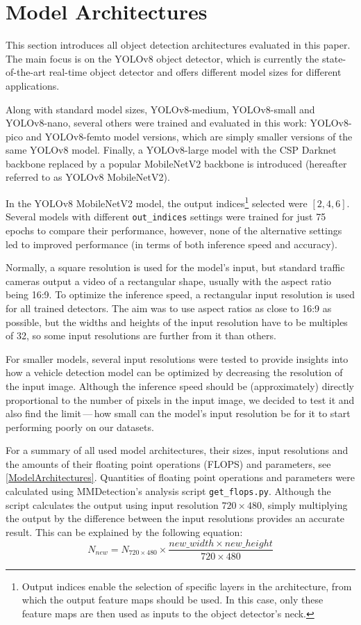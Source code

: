 \section{Model Architectures}


This section introduces all object detection architectures evaluated in this
paper.  The main focus is on the YOLOv8 object detector, which is currently the
state-of-the-art real-time object detector and offers different model sizes for
different applications.

Along with standard model sizes, YOLOv8-medium, YOLOv8-small and YOLOv8-nano,
several others were trained and evaluated in this work: YOLOv8-pico and
YOLOv8-femto model versions, which are simply smaller versions of the same
YOLOv8 model. Finally, a YOLOv8-large model with the CSP Darknet backbone
replaced by a popular MobileNetV2 backbone is introduced (hereafter referred to
as YOLOv8 MobileNetV2).

In the YOLOv8 MobileNetV2 model, the output indices\footnote{Output indices
enable the selection of specific layers in the architecture, from which the
output feature maps should be used. In this case, only these feature maps are
then used as inputs to the object detector's neck.} selected were $[2, 4, 6]$.
Several models with different \texttt{out\_indices} settings were trained for
just 75 epochs to compare their performance, however, none of the alternative
settings led to improved performance (in terms of both inference speed and
accuracy).

Normally, a square resolution is used for the model's input, but standard traffic cameras
output a video of a rectangular shape, usually with the aspect ratio being 16:9.
To optimize the inference speed, a rectangular input resolution is used for all
trained detectors. The aim was to use aspect ratios as close to 16:9 as
possible, but the widths and heights of the input resolution have to be multiples of
32, so some input resolutions are further from it than others.

For smaller models, several input resolutions were tested to provide insights
into how a vehicle detection model can be optimized by decreasing the resolution
of the input image. Although the inference speed should be (approximately)
directly proportional to the number of pixels in the input image, we decided to
test it and also find the limit\,---\,how small can the model's input resolution
be for it to start performing poorly on our datasets.

For a summary of all used model architectures, their sizes, input resolutions and the
amounts of their floating point operations (FLOPS) and parameters, see
\autoref{ModelArchitectures}. Quantities of floating point operations and
parameters were calculated using MMDetection's analysis script
\verb|get_flops.py|. Although the script calculates the output using input
resolution $720 \times 480$, simply multiplying the output by the difference
between the input resolutions provides an accurate result. This can be explained
by the following equation:
\begin{equation}
    N_{new} = N_{720 \times 480} \times \frac{new\_width \times new\_height}{720 \times 480}
\end{equation}

